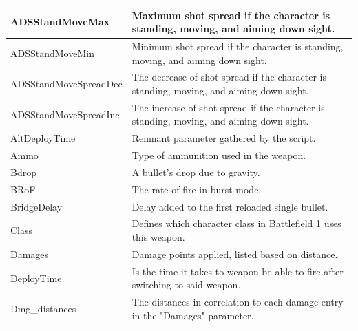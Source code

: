 \documentclass[MGS,Master,english]{twbook}%
\begin{document}
\begin{longtable}[c]{|l|p{10.5cm}|}
	ADSStandMoveMax        & Maximum shot spread if the character is standing, moving, and aiming down sight.                                               \\ \hline
	ADSStandMoveMin        & Minimum shot spread if the character is standing, moving, and aiming down sight.                                               \\ \hline
	ADSStandMoveSpreadDec  & The decrease of shot spread if the character is standing, moving, and aiming down sight.                                       \\ \hline
	ADSStandMoveSpreadInc  & The increase of shot spread if the character is standing, moving, and aiming down sight.                                       \\ \hline
	AltDeployTime          & Remnant parameter gathered by the script.                                                                                      \\ \hline
	Ammo                   & Type of ammunition used in the weapon.                                                                                         \\ \hline
	Bdrop                  & A bullet's drop due to gravity.                                                                                                \\ \hline
	BRoF                   & The rate of fire in burst mode.                                                                                                \\ \hline
	BridgeDelay            & Delay added to the first reloaded single bullet.                                                                               \\ \hline
	Class                  & Defines which character class in Battlefield 1 uses this weapon.                                                               \\ \hline
	Damages                & Damage points applied, listed based on distance.                                                                               \\ \hline
	DeployTime             & Is the time it takes to weapon be able to fire after switching to said weapon.                                                 \\ \hline
	Dmg\_distances         & The distances in correlation to each damage entry in the "Damages" parameter.                                                  \\ \hline

\end{longtable}
\end{document}

